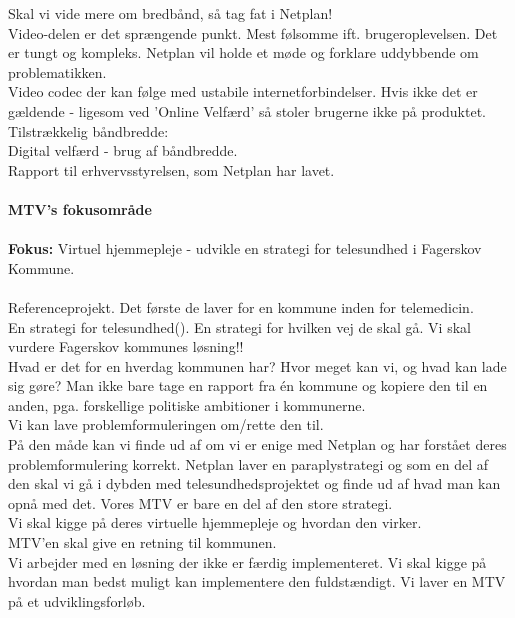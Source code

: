 Skal vi vide mere om bredbånd, så tag fat i Netplan!\\
Video-delen er det sprængende punkt. Mest følsomme ift. brugeroplevelsen. Det er tungt og kompleks. Netplan vil holde et møde og forklare uddybbende om problematikken. \\
Video codec der kan følge med ustabile internetforbindelser. Hvis ikke det er gældende - ligesom ved 'Online Velfærd' så stoler brugerne ikke på produktet. \\

Tilstrækkelig båndbredde:\\
Digital velfærd - brug af båndbredde.\\
Rapport til erhvervsstyrelsen, som Netplan har lavet.\\\\

\textbf{MTV's fokusområde}\\\\
\textbf{Fokus:} Virtuel hjemmepleje - udvikle en strategi for telesundhed i Fagerskov Kommune.
\\\\
Referenceprojekt. Det første de laver for en kommune inden for telemedicin.\\
En strategi for telesundhed(). En strategi for hvilken vej de skal gå.
Vi skal vurdere Fagerskov kommunes løsning!! \\
Hvad er det for en hverdag kommunen har? Hvor meget kan vi, og hvad kan lade sig gøre? Man ikke bare tage en rapport fra én kommune og kopiere den til en anden, pga. forskellige politiske ambitioner i kommunerne. \\
Vi kan lave problemformuleringen om/rette den til. \\
På den måde kan vi finde ud af om vi er enige med Netplan og har forstået deres problemformulering korrekt. 
Netplan laver en paraplystrategi og som en del af den skal vi gå i dybden med telesundhedsprojektet og finde ud af hvad man kan opnå med det. Vores MTV er bare en del af den store strategi. \\ 
Vi skal kigge på deres virtuelle hjemmepleje og hvordan den virker.\\
MTV'en skal give en retning til kommunen. \\
Vi arbejder med en løsning der ikke er færdig implementeret. Vi skal kigge på hvordan man bedst muligt kan implementere den fuldstændigt. Vi laver en MTV på et udviklingsforløb. 
 
